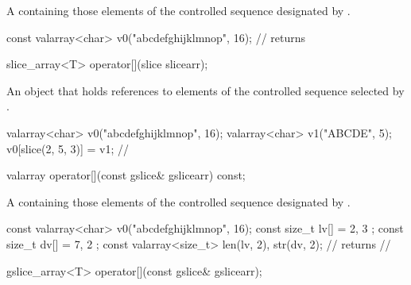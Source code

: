 \begin{itemdescr}
\pnum
\returns A  containing those
elements of the controlled sequence designated by .
\begin{example}
\begin{codeblock}
const valarray<char> v0("abcdefghijklmnop", 16);
//  returns 
\end{codeblock}
\end{example}
\end{itemdescr}

%
\begin{itemdecl}
slice_array<T> operator[](slice slicearr);
\end{itemdecl}

\begin{itemdescr}
\pnum
\returns An object that holds references to elements of the controlled
sequence selected by . \begin{example}
\begin{codeblock}
valarray<char> v0("abcdefghijklmnop", 16);
valarray<char> v1("ABCDE", 5);
v0[slice(2, 5, 3)] = v1;
// 
\end{codeblock}
\end{example}
\end{itemdescr}

%
\begin{itemdecl}
valarray operator[](const gslice& gslicearr) const;
\end{itemdecl}

\begin{itemdescr}
\pnum
\returns A  containing those
elements of the controlled sequence designated by .
\begin{example}
\begin{codeblock}
const valarray<char> v0("abcdefghijklmnop", 16);
const size_t lv[] = { 2, 3 };
const size_t dv[] = { 7, 2 };
const valarray<size_t> len(lv, 2), str(dv, 2);
//  returns
// 
\end{codeblock}
\end{example}
\end{itemdescr}

%
\begin{itemdecl}
gslice_array<T> operator[](const gslice& gslicearr);
\end{itemdecl}

